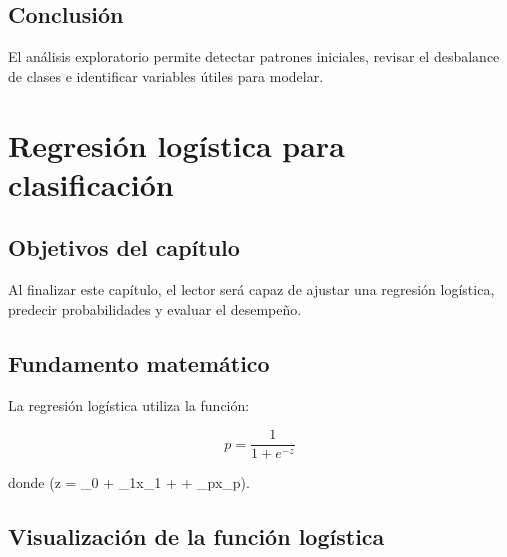\documentclass[
  spanish,
  11pt,
  letterpaper,
]{book}
\begin{document}
\section{Conclusión}\label{conclusiuxf3n-1}

El análisis exploratorio permite detectar patrones iniciales, revisar el
desbalance de clases e identificar variables útiles para modelar.


\chapter{Regresión logística para
clasificación}\label{regresiuxf3n-loguxedstica-para-clasificaciuxf3n}

\section{Objetivos del capítulo}\label{objetivos-del-capuxedtulo-3}

Al finalizar este capítulo, el lector será capaz de ajustar una
regresión logística, predecir probabilidades y evaluar el desempeño.

\section{Fundamento matemático}\label{fundamento-matemuxe1tico}

La regresión logística utiliza la función:

\[
p = \frac{1}{1 + e^{-z}}
\]

donde (z = \beta\_0 + \beta\_1x\_1 + \cdots + \beta\_px\_p).

\section{Visualización de la función
logística}\label{visualizaciuxf3n-de-la-funciuxf3n-loguxedstica}
\end{document}

